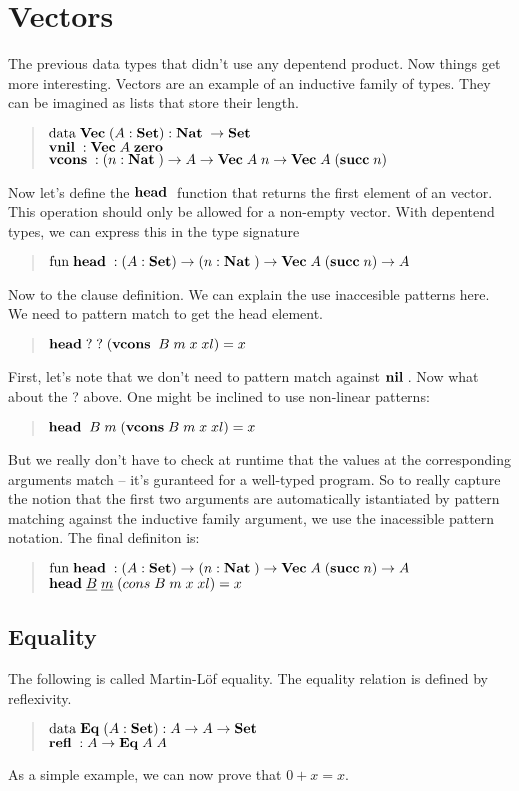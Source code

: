 \section{Vectors}
The previous data types that didn't use any depentend product. 
Now things get more interesting.
Vectors are an example of an inductive family of types.
They can be imagined as lists that store their length.
\begin{quote}
$\mathrm{data}\; \mathbf{Vec}\; ( A : \mathbf{Set} ) : \mathbf{Nat}\; \rightarrow \mathbf{Set} $ 
\\
$\mathbf{vnil}\; : \mathbf{Vec}\; A \; \mathbf{zero}\;  $
\\
$\mathbf{vcons}\; : ( n : \mathbf{Nat}\; ) \rightarrow  A \rightarrow \mathbf{Vec}\; A \; n \rightarrow \mathbf{Vec}\; A \; (\mathbf{succ}\; n) $
\end{quote}
Now let's define the $\mathbf{head}\;$ function that returns the first element of an vector. This operation should only be allowed for a non-empty vector.
With depentend types, we can express this in the type signature
\begin{quote}
$ \mathrm{fun}\; \mathbf{head}\; : ( A : \mathbf{Set} ) \rightarrow ( n : \mathbf{Nat}\; ) \rightarrow \mathbf{Vec}\; A \; (\mathbf{succ}\; n) \rightarrow A $
\end{quote}
Now to the clause definition. We can explain the use inaccesible patterns here.
We need to pattern match to get the head element.
\begin{quote}
$\mathbf{head}\; ? \; ? \; (\mathbf{vcons}\; \; B \; m \; x \; xl) = x $
\end{quote}
First, let's note that we don't need to pattern match against $\mathbf{nil}\;$.
Now what about the ? above. 
One might be inclined to use non-linear patterns:
\begin{quote}
$\mathbf{head}\; \; B \; m \; (\mathbf{vcons}\;  B \; m \; x \; xl) = x $
\end{quote}
But we really don't have to check at runtime that the values at the corresponding arguments match -- it's guranteed for a well-typed program.
So to really capture the notion that the first two arguments are automatically istantiated by pattern matching against the inductive family argument, we use the inacessible pattern notation. The final definiton is:
\begin{quote}
$ \mathrm{fun}\; \mathbf{head}\; : ( A : \mathbf{Set} ) \rightarrow ( n : \mathbf{Nat}\; ) \rightarrow \mathbf{Vec}\; A \; (\mathbf{succ}\; n) \rightarrow A $
\\
$\mathbf{head}\; \underline{B} \; \underline{m} \; (cons \; B \; m \; x \; xl) = x $
\end{quote}

\subsection{Equality}
The following is called Martin-L\"of equality.
The equality relation is defined by reflexivity.
\begin{quote}
$\mathrm{data}\; \mathbf{Eq}\; ( A : \mathbf{Set} ) : A \rightarrow A \rightarrow \mathbf{Set} $ 
\\
$\mathbf{refl}\; : A \rightarrow \mathbf{Eq}\; A \; A  $
\end{quote}
As a simple example, we can now prove that $ 0 + x = x $.

